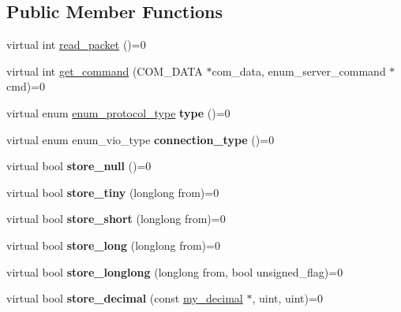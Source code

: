 \subsection*{Public Member Functions}
\begin{DoxyCompactItemize}
\item 
virtual int \mbox{\hyperlink{classProtocol_a864cc6313ff0a75ce7a69dd7c89de4a7}{read\+\_\+packet}} ()=0
\item 
virtual int \mbox{\hyperlink{classProtocol_a636debc9b25f4e60864902cdd1b3e87a}{get\+\_\+command}} (C\+O\+M\+\_\+\+D\+A\+TA $\ast$com\+\_\+data, enum\+\_\+server\+\_\+command $\ast$cmd)=0
\item 
\mbox{\label{classProtocol_aa44c608bf9b7e57e930b91bf6c1d08f7}} 
virtual enum \mbox{\hyperlink{classProtocol_ab1d147a8122f4ea4f8516ee23c514b02}{enum\+\_\+protocol\+\_\+type}} {\bfseries type} ()=0
\item 
\mbox{\label{classProtocol_a1c9653bc39aaea28198633fd798bfe9a}} 
virtual enum enum\+\_\+vio\+\_\+type {\bfseries connection\+\_\+type} ()=0
\item 
\mbox{\label{classProtocol_a0b94a6ffc8dd31e6921432cc35fa6385}} 
virtual bool {\bfseries store\+\_\+null} ()=0
\item 
\mbox{\label{classProtocol_a5b017df1ed6f4672d01b104c7d874e92}} 
virtual bool {\bfseries store\+\_\+tiny} (longlong from)=0
\item 
\mbox{\label{classProtocol_a8d69a42de2289d066d851f4fb8c28191}} 
virtual bool {\bfseries store\+\_\+short} (longlong from)=0
\item 
\mbox{\label{classProtocol_a36c3efb62fe0f899583b595a6cc12619}} 
virtual bool {\bfseries store\+\_\+long} (longlong from)=0
\item 
\mbox{\label{classProtocol_a84d763243a8ed7cc2aba14c62d295071}} 
virtual bool {\bfseries store\+\_\+longlong} (longlong from, bool unsigned\+\_\+flag)=0
\item 
\mbox{\label{classProtocol_a1659b5319cf3652e19901af39cd49ba0}} 
virtual bool {\bfseries store\+\_\+decimal} (const \mbox{\hyperlink{classmy__decimal}{my\+\_\+decimal}} $\ast$, uint, uint)=0

\end{DoxyCompactItemize}
